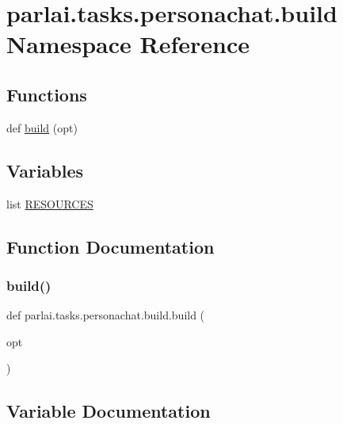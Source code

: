 \hypertarget{namespaceparlai_1_1tasks_1_1personachat_1_1build}{}\section{parlai.\+tasks.\+personachat.\+build Namespace Reference}
\label{namespaceparlai_1_1tasks_1_1personachat_1_1build}
\subsection*{Functions}
\begin{DoxyCompactItemize}
\item 
def \hyperlink{namespaceparlai_1_1tasks_1_1personachat_1_1build_a20041fc9bc8f146d3d5ddd944053807f}{build} (opt)
\end{DoxyCompactItemize}
\subsection*{Variables}
\begin{DoxyCompactItemize}
\item 
list \hyperlink{namespaceparlai_1_1tasks_1_1personachat_1_1build_a8cb7927fde830902b3b916a71b518d9a}{R\+E\+S\+O\+U\+R\+C\+ES}
\end{DoxyCompactItemize}


\subsection{Function Documentation}
\mbox{\label{namespaceparlai_1_1tasks_1_1personachat_1_1build_a20041fc9bc8f146d3d5ddd944053807f}} 
\subsubsection{\texorpdfstring{build()}{build()}}
{\footnotesize\ttfamily def parlai.\+tasks.\+personachat.\+build.\+build (\begin{DoxyParamCaption}\item[{}]{opt }\end{DoxyParamCaption})}



\subsection{Variable Documentation}
\mbox{\label{namespaceparlai_1_1tasks_1_1personachat_1_1build_a8cb7927fde830902b3b916a71b518d9a}} 
